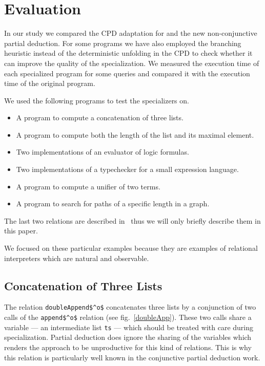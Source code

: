 \section{Evaluation}
In our study we compared the CPD adaptation for \mk{} and the new non-conjunctive partial deduction.
For some programs we have also employed the branching heuristic instead of the deterministic unfolding in the CPD to check whether it can improve the quality of the specialization.
We measured the execution time of each specialized program for some queries and compared it with the execution time of the original program.

We used the following programs to test the specializers on.
\begin{itemize}
  \item A program to compute a concatenation of three lists.
  \item A program to compute both the length of the list and its maximal element.
  \item Two implementations of an evaluator of logic formulas.
  \item Two implementations of a typechecker for a small expression language.
  \item A program to compute a unifier of two terms.
  \item A program to search for paths of a specific length in a graph.
\end{itemize}

The last two relations are described in~\cite{lozov2019relational} thus we will only briefly describe them in this paper.

We focused on these particular examples because they are examples of relational interpreters which are natural and observable.

\subsection{Concatenation of Three Lists}

The relation \lstinline{doubleAppend$^o$} concatenates three lists by a conjunction of two calls of the \lstinline{append$^o$} relation (see fig.~\ref{doubleApp}).
These two calls share a variable --- an intermediate list \lstinline{ts} --- which should be treated with care during specialization.
Partial deduction does ignore the sharing of the variables which renders the approach to be unproductive for this kind of relations.
This is why this relation is particularly well known in the conjunctive partial deduction work.

